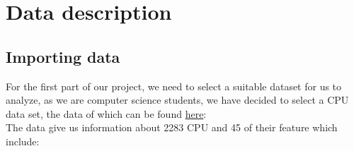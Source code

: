 %
%   
\clearpage
\section{Data description}




\subsection{Importing data}
For the first part of our project, we need to select a suitable dataset for us to analyze, as we are computer science students, we have decided to select a CPU data set, the data of which can be found \href{https://www.kaggle.com/datasets/iliassekkaf/computerparts?select=Intel_CPUs.csv}{here}:
\\
The data give us information about 2283 CPU and 45 of their feature which include:
\\
